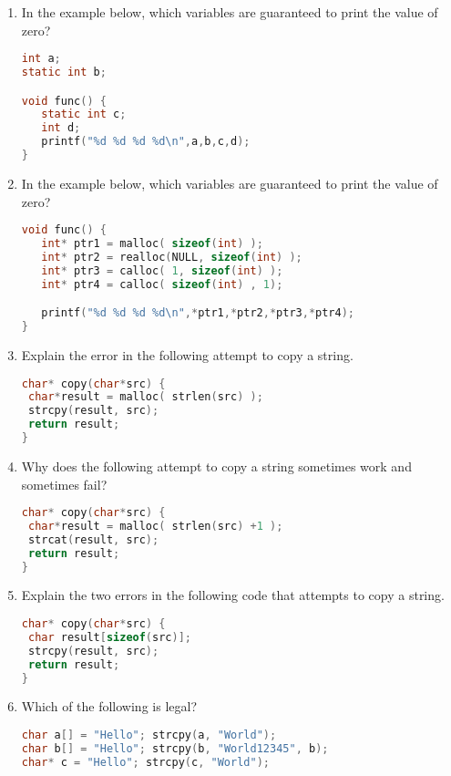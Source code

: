 \begin{enumerate}

\item In the example below, which variables are guaranteed to print the value of zero?

\begin{lstlisting}[language=C]
int a;
static int b;

void func() {
   static int c;
   int d;
   printf("%d %d %d %d\n",a,b,c,d);
}
\end{lstlisting}

\item In the example below, which variables are guaranteed to print the value of zero?

\begin{lstlisting}[language=C]
void func() {
   int* ptr1 = malloc( sizeof(int) );
   int* ptr2 = realloc(NULL, sizeof(int) );
   int* ptr3 = calloc( 1, sizeof(int) );
   int* ptr4 = calloc( sizeof(int) , 1);

   printf("%d %d %d %d\n",*ptr1,*ptr2,*ptr3,*ptr4);
}
\end{lstlisting}

\item Explain the error in the following attempt to copy a string.

\begin{lstlisting}[language=C]
char* copy(char*src) {
 char*result = malloc( strlen(src) );
 strcpy(result, src);
 return result;
}
\end{lstlisting}

\item Why does the following attempt to copy a string sometimes work and sometimes fail?

\begin{lstlisting}[language=C]
char* copy(char*src) {
 char*result = malloc( strlen(src) +1 );
 strcat(result, src);
 return result;
}
\end{lstlisting}

\item Explain the two errors in the following code that attempts to copy a string.

\begin{lstlisting}[language=C]
char* copy(char*src) {
 char result[sizeof(src)];
 strcpy(result, src);
 return result;
}
\end{lstlisting}

\item Which of the following is legal?

\begin{lstlisting}[language=C]
char a[] = "Hello"; strcpy(a, "World");
char b[] = "Hello"; strcpy(b, "World12345", b);
char* c = "Hello"; strcpy(c, "World");
\end{lstlisting}


\end{enumerate}
